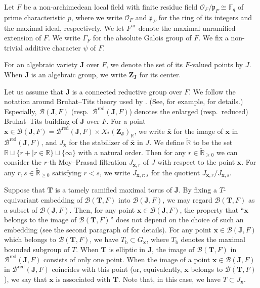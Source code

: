 \documentclass{amsart}
\newcommand{\red}{\mathrm{red}}
\newcommand{\ur}{\mathrm{ur}}
\newcommand{\cO}{\mathcal{O}}
\newcommand{\mcO}{\mathcal{O}}
\newcommand{\mfp}{\mathfrak{p}}
\newcommand{\bfT}{\mathbf{T}}
\newcommand{\x}{\mathbf{x}}
\newcommand{\FF}{\mathbb{F}}
\newcommand{\R}{\mathbb{R}}
\newcommand{\J}{\mathbf{J}}
\newcommand{\bfZ}{\mathbf{Z}}
\newcommand{\mcB}{\mathcal{B}}
\theoremstyle{plain}
\theoremstyle{definition}
\theoremstyle{remark}
\theoremstyle{theorem}
\begin{document}
Let $F$ be a non-archimedean local field with finite residue field $\cO_F/\mfp_F \cong \FF_q$ of prime characteristic $p$, where we write $\mcO_{F}$ and $\mfp_{F}$ for the ring of its integers and the maximal ideal, respectively.
We let $F^{\ur}$ denote the maximal unramified extension of $F$.
We write $\Gamma_{F}$ for the absolute Galois group of $F$.
We fix a non-trivial additive character $\psi$ of $F$.

For an algebraic variety $\J$ over $F$, we denote the set of its $F$-valued points by $J$.
When $\J$ is an algebraic group, we write $\bfZ_{\J}$ for its center.

Let us assume that $\J$ is a connected reductive group over $F$.
We follow the notation around Bruhat--Tits theory used by \cite{AS08, AS09, DS18}.
(See, for example, \cite[Section 3.1]{AS08} for  details.)
Especially, $\mcB(\J,F)$ (resp.\ $\mcB^{\red}(\J,F)$) denotes the enlarged (resp.\ reduced) Bruhat--Tits building of $\J$ over $F$.
For a point $\x\in\mcB(\J,F)=\mcB^{\red}(\J,F)\times X_{\ast}(\bfZ_{\J})_{\R}$, we write $\bar{\x}$ for the image of $\x$ in $\mcB^{\red}(\J,F)$, and $J_{\bar{\x}}$ for the stabilizer of $\bar{\x}$ in $J$.
We define $\widetilde{\R}$ to be the set $\R\sqcup\{r+\mid r\in\R\}\sqcup\{\infty\}$ with a natural order.
Then for any $r\in\widetilde{\R}_{\geq0}$ we can consider the $r$-th Moy--Prasad filtration $J_{\x,r}$ of $J$ with respect to the point $\x$.
For any $r,s\in\widetilde{\R}_{\geq0}$ satisfying $r<s$, we write $J_{\x,r:s}$ for the quotient $J_{\x,r}/J_{\x,s}$.

Suppose that $\bfT$ is a tamely ramified maximal torus of $\J$.
By fixing a $T$-equivariant embedding of $\mcB(\bfT,F)$ into $\mcB(\J,F)$, we may regard $\mcB(\bfT,F)$ as a subset of $\mcB(\J,F)$.
Then, for any point $\x\in\mcB(\J,F)$, the property that ``$\x$ belongs to the image of $\mcB(\bfT,F)$'' does not depend on the choice of such an embedding (see the second paragraph of \cite[Section 3]{FKS21} for details).
For any point $\x\in\mcB(\J,F)$ which belongs to $\mcB(\bfT,F)$, we have $T_{\mathrm{b}}\subset G_{\x}$, where $T_{\mathrm{b}}$ denotes the maximal bounded subgroup of $T$.
When $\bfT$ is elliptic in $\J$, the image of $\mcB(\bfT,F)$ in $\mcB^{\red}(\J,F)$ consists of only one point.
When the image of a point $\x\in\mcB(\J,F)$ in $\mcB^{\red}(\J,F)$ coincides with this point (or, equivalently, $\x$ belongs to $\mcB(\bfT,F)$), we say that $\x$ is associated with $\bfT$.
Note that, in this case, we have $T \subset J_{\bar{\x}}$.
\end{document}
